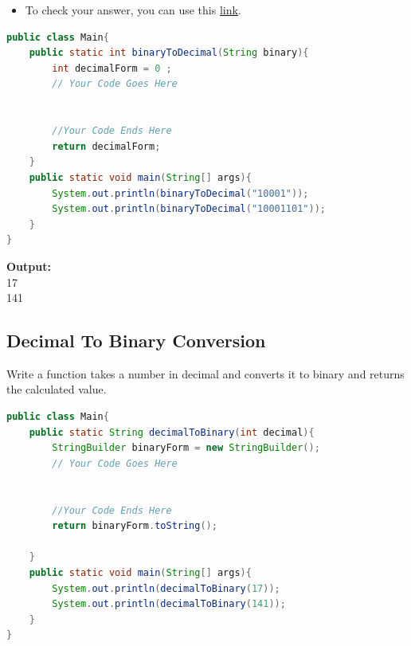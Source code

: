 \documentclass[12pt , a4paper]{article}
\begin{document}
	\begin{importantBox}

		\begin{itemize}
			\item To check your answer, you can use this \href{https://www.rapidtables.com/convert/number/binary-to-decimal.html}{link}.
		\end{itemize}
	\end{importantBox}

	\begin{lstlisting}[language=Java]
public class Main{
	public static int binaryToDecimal(String binary){
		int decimalForm = 0 ;
		// Your Code Goes Here


		//Your Code Ends Here
		return decimalForm;
	}
	public static void main(String[] args){	
		System.out.println(binaryToDecimal("10001"));	
		System.out.println(binaryToDecimal("10001101"));		
	}
}		
	\end{lstlisting}

	\begin{tcolorbox}
	\textbf{Output:}\\
	17 \\
	141\\
	\end{tcolorbox}




	\newpage
	\subsection{Decimal To Binary Conversion}
Write a function takes a number in decimal and converts it to binary and returns the calculated value.
	\begin{lstlisting}[language=Java]
public class Main{
	public static String decimalToBinary(int decimal){
		StringBuilder binaryForm = new StringBuilder();
		// Your Code Goes Here


		//Your Code Ends Here
		return binaryForm.toString();

	}
	public static void main(String[] args){	
		System.out.println(decimalToBinary(17));	
		System.out.println(decimalToBinary(141));		
	}
}		
	\end{lstlisting}
\end{document}
